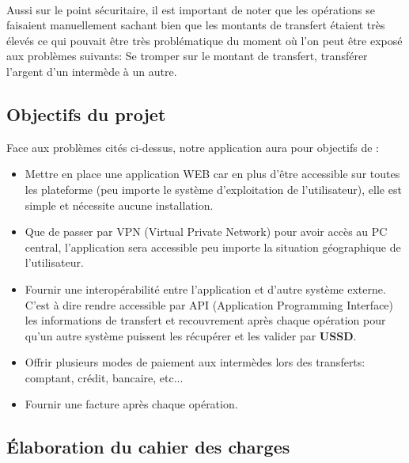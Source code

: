 		\paragraph{}Aussi sur le point sécuritaire, il est important de noter que les opérations se faisaient manuellement sachant bien que les montants de transfert étaient très élevés ce qui pouvait être très problématique du moment où l'on peut être exposé aux problèmes suivants: Se tromper sur le montant de transfert, transférer l'argent d'un intermède	à un autre.\\
		
\subsection{Objectifs du projet}
	Face aux problèmes cités ci-dessus, notre application aura pour objectifs de :
	\begin{itemize}
		
		\item Mettre en place une application WEB car en plus d’être accessible sur toutes les plateforme (peu importe le système d'exploitation de l'utilisateur), elle est simple et nécessite aucune installation.\\
		
		
		
		\item Que de passer par VPN (Virtual Private Network) pour avoir accès au PC central, l’application sera accessible peu importe la situation géographique de l'utilisateur.\\
		
		\item Fournir une interopérabilité entre l'application et d'autre système externe. C'est à dire rendre accessible par API (Application Programming Interface) les informations de transfert et recouvrement après chaque opération pour qu'un autre système puissent les récupérer et les valider par \textbf{USSD}.\\
		
		\item Offrir plusieurs modes de paiement aux intermèdes lors des transferts: comptant, crédit, bancaire, etc...
		
		\item Fournir une facture après chaque opération.
		
		
	\end{itemize}
\subsection{Élaboration du cahier des charges}
	

